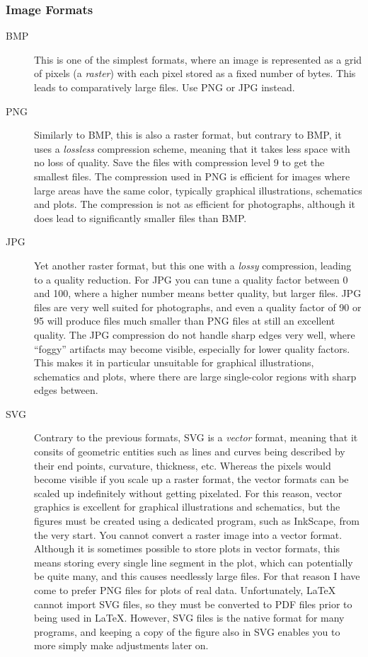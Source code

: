 \documentclass[a4paper,twocolumn]{article}
\begin{document}
\subsubsection{Image Formats}
\begin{description}
    \item[BMP] This is one of the simplest formats, where an image is represented as a grid of pixels (a \emph{raster}) with each pixel stored as a fixed number of bytes. This leads to comparatively large files. Use PNG or JPG instead.
    \item[PNG] Similarly to BMP, this is also a raster format, but contrary to BMP, it uses a \emph{lossless} compression scheme, meaning that it takes less space with no loss of quality. Save the files with compression level 9 to get the smallest files. The compression used in PNG is efficient for images where large areas have the same color, typically graphical illustrations, schematics and plots. The compression is not as efficient for photographs, although it does lead to significantly smaller files than BMP.
    \item[JPG] Yet another raster format, but this one with a \emph{lossy} compression, leading to a quality reduction. For JPG you can tune a quality factor between 0 and 100, where a higher number means better quality, but larger files. JPG files are very well suited for photographs, and even a quality factor of 90 or 95 will produce files much smaller than PNG files at still an excellent quality. The JPG compression do not handle sharp edges very well, where ``foggy'' artifacts may become visible, especially for lower quality factors. This makes it in particular unsuitable for graphical illustrations, schematics and plots, where there are large single-color regions with sharp edges between.
    \item[SVG] Contrary to the previous formats, SVG is a \emph{vector} format, meaning that it consits of geometric entities such as lines and curves being described by their end points, curvature, thickness, etc. Whereas the pixels would become visible if you scale up a raster format, the vector formats can be scaled up indefinitely without getting pixelated. For this reason, vector graphics is excellent for graphical illustrations and schematics, but the figures must be created using a dedicated program, such as InkScape, from the very start. You cannot convert a raster image into a vector format. Although it is sometimes possible to store plots in vector formats, this means storing every single line segment in the plot, which can potentially be quite many, and this causes needlessly large files. For that reason I have come to prefer PNG files for plots of real data. Unfortunately, \LaTeX{} cannot import SVG files, so they must be converted to PDF files prior to being used in \LaTeX{}. However, SVG files is the native format for many programs, and keeping a copy of the figure also in SVG enables you to more simply make adjustments later on.

\end{description}
\end{document}
